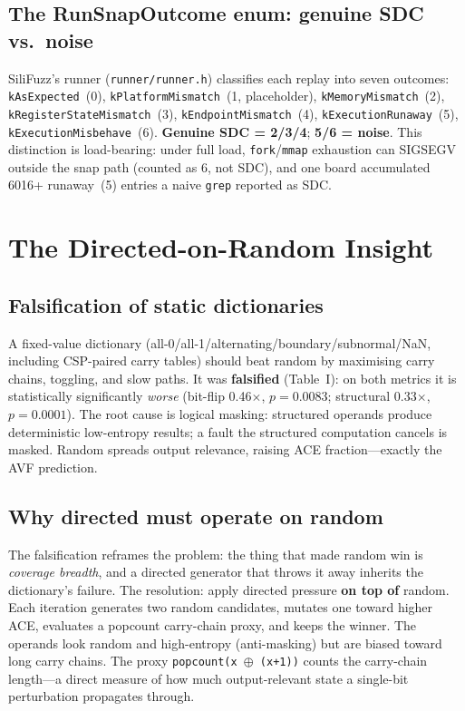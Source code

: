\documentclass[sigplan,review,anonymous]{acmart}
\begin{document}
\subsection{The RunSnapOutcome enum: genuine SDC vs.\ noise}
SiliFuzz's runner (\texttt{runner/runner.h}) classifies each replay into seven outcomes: \texttt{kAsExpected}~(0), \texttt{kPlatformMismatch}~(1, placeholder), \texttt{kMemoryMismatch}~(2), \texttt{kRegisterStateMismatch}~(3), \texttt{kEndpointMismatch}~(4), \texttt{kExecutionRunaway}~(5), \texttt{kExecutionMisbehave}~(6). \textbf{Genuine SDC = 2/3/4}; \textbf{5/6 = noise}. This distinction is load-bearing: under full load, \texttt{fork}/\texttt{mmap} exhaustion can SIGSEGV outside the snap path (counted as 6, not SDC), and one board accumulated 6016+ runaway~(5) entries a naive \texttt{grep} reported as SDC.

\section{The Directed-on-Random Insight}
\label{sec:insight}

\subsection{Falsification of static dictionaries}
A fixed-value dictionary (all-0/all-1/alternating/boundary/subnormal/NaN, including CSP-paired carry tables) should beat random by maximising carry chains, toggling, and slow paths. It was \textbf{falsified} (Table~I): on both metrics it is statistically significantly \emph{worse} (bit-flip 0.46$\times$, $p{=}0.0083$; structural 0.33$\times$, $p{=}0.0001$). The root cause is logical masking: structured operands produce deterministic low-entropy results; a fault the structured computation cancels is masked. Random spreads output relevance, raising ACE fraction---exactly the AVF prediction.

\subsection{Why directed must operate on random}
The falsification reframes the problem: the thing that made random win is \emph{coverage breadth}, and a directed generator that throws it away inherits the dictionary's failure. The resolution: apply directed pressure \textbf{on top of} random. Each iteration generates two random candidates, mutates one toward higher ACE, evaluates a popcount carry-chain proxy, and keeps the winner. The operands look random and high-entropy (anti-masking) but are biased toward long carry chains. The proxy \texttt{popcount(x $\oplus$ (x+1))} counts the carry-chain length---a direct measure of how much output-relevant state a single-bit perturbation propagates through.
\end{document}
